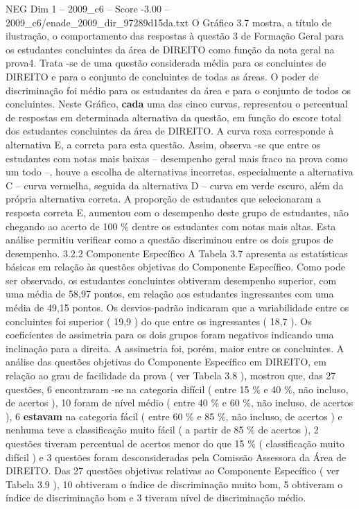 \begin{textsample}{NEG Dim 1 – 2009\_c6 – Score -3.00 – 2009\_c6/enade\_2009\_dir\_97289d15da.txt}
O Gráfico 3.7 mostra, a título de ilustração, o comportamento das respostas à questão 3 de Formação Geral para os estudantes concluintes da área de DIREITO como função da nota geral na prova4.
Trata -se de uma questão considerada média para os concluintes de DIREITO e para o conjunto de concluintes de todas as áreas.
O poder de discriminação foi médio para os estudantes da área e para o conjunto de todos os concluintes.
Neste Gráfico, \textbf{cada} uma das cinco curvas, representou o percentual de respostas em determinada alternativa da questão, em função do escore total dos estudantes concluintes da área de DIREITO.
A curva roxa corresponde à alternativa E, a correta para esta questão.
Assim, observa -se que entre os estudantes com notas mais baixas – desempenho geral mais fraco na prova como um todo –, houve a escolha de alternativas incorretas, especialmente a alternativa C – curva vermelha, seguida da alternativa D – curva em verde escuro, além da própria alternativa correta.
A proporção de estudantes que selecionaram a resposta correta E, aumentou com o desempenho deste grupo de estudantes, não chegando ao acerto de 100 \% dentre os estudantes com notas mais altas.
Esta análise permitiu verificar como a questão discriminou entre os dois grupos de desempenho. 3.2.2 Componente Específico A Tabela 3.7 apresenta as estatísticas básicas em relação às questões objetivas do Componente Específico.
Como pode ser observado, os estudantes concluintes obtiveram desempenho superior, com uma média de 58,97 pontos, em relação aos estudantes ingressantes com uma média de 49,15 pontos.
Os desvios-padrão indicaram que a variabilidade entre os concluintes foi superior ( 19,9 ) do que entre os ingressantes ( 18,7 ).
Os coeficientes de assimetria para os dois grupos foram negativos indicando uma inclinação para a direita.
A assimetria foi, porém, maior entre os concluintes.
A análise das questões objetivas do Componente Específico em DIREITO, em relação ao grau de facilidade da prova ( ver Tabela 3.8 ), mostrou que, das 27 questões, 6 encontraram -se na categoria difícil ( entre 15 \% e 40 \%, não incluso, de acertos ), 10 foram de nível médio ( entre 40 \% e 60 \%, não incluso, de acertos ), 6 \textbf{estavam} na categoria fácil ( entre 60 \% e 85 \%, não incluso, de acertos ) e nenhuma teve a classificação muito fácil ( a partir de 85 \% de acertos ), 2 questões tiveram percentual de acertos menor do que 15 \% ( classificação muito difícil ) e 3 questões foram desconsideradas pela Comissão Assessora da Área de DIREITO.
Das 27 questões objetivas relativas ao Componente Específico ( ver Tabela 3.9 ), 10 obtiveram o índice de discriminação muito bom, 5 obtiveram o índice de discriminação bom e 3 tiveram nível de discriminação médio.

\end{textsample}
